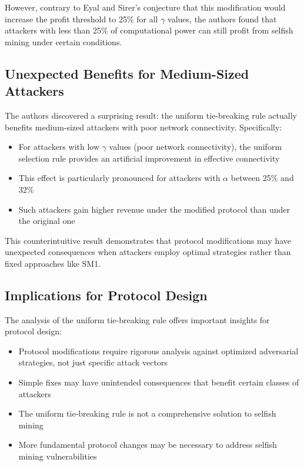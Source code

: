 \documentclass[conference]{IEEEtran}
\begin{document}
However, contrary to Eyal and Sirer's conjecture that this modification would increase the profit threshold to 25\% for all $\gamma$ values, the authors found that attackers with less than 25\% of computational power can still profit from selfish mining under certain conditions.

\subsection{Unexpected Benefits for Medium-Sized Attackers}

The authors discovered a surprising result: the uniform tie-breaking rule actually benefits medium-sized attackers with poor network connectivity. Specifically:

\begin{itemize}
    \item For attackers with low $\gamma$ values (poor network connectivity), the uniform selection rule provides an artificial improvement in effective connectivity
    \item This effect is particularly pronounced for attackers with $\alpha$ between 25\% and 32\%
    \item Such attackers gain higher revenue under the modified protocol than under the original one
\end{itemize}

This counterintuitive result demonstrates that protocol modifications may have unexpected consequences when attackers employ optimal strategies rather than fixed approaches like SM1.

\subsection{Implications for Protocol Design}

The analysis of the uniform tie-breaking rule offers important insights for protocol design:

\begin{itemize}
    \item Protocol modifications require rigorous analysis against optimized adversarial strategies, not just specific attack vectors
    \item Simple fixes may have unintended consequences that benefit certain classes of attackers
    \item The uniform tie-breaking rule is not a comprehensive solution to selfish mining
    \item More fundamental protocol changes may be necessary to address selfish mining vulnerabilities
\end{itemize}
\end{document}
